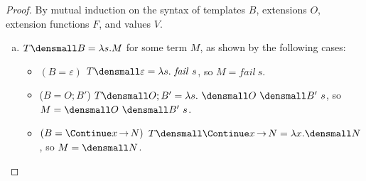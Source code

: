 \allowdisplaybreaks




\thmvaluetranslation*
\begin{proof}

  By mutual induction on the syntax of templates $B$, extensions $O$, extension functions $F$, and values $V$.
  \begin{enumerate}[(a)]
  \item $T\den{B} = \lambda s. M$ for some term $M$, as shown by the following cases:
    \begin{itemize}
    \item $(B = \varepsilon)$
      $T\den{\varepsilon} = \lambda s. ~\mathit{fail} ~s$, so $M=\mathit{fail} ~s$.
    \item ($B = O; B'$)
      $T\den{O; B'} = \lambda s. ~\den{O} ~\den{B'} ~s$, so $M = \den{O} ~\den{B'} ~s$.
    \item $(B = \Continue x {\,\to\,} N)$
      $T\den{\Continue x {\,\to\,} N} = \lambda x. \den{N}$, so $M = \den{N}$.

\end{itemize}
\end{enumerate}
\end{proof}
